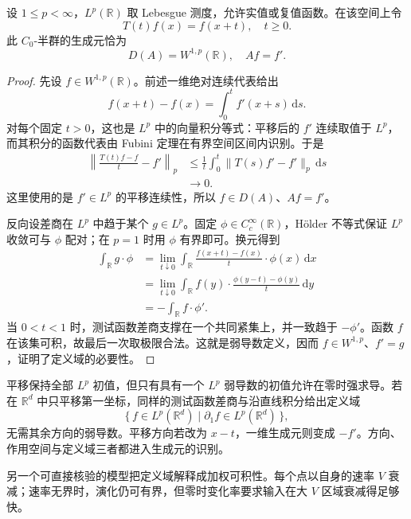 \begin{proposition}[平移生成元]\label{b2:prop:D-translation-generator}
设 \(1\leq p<\infty\)，\(L^p(\mathbb R)\) 取 Lebesgue 测度，允许实值或复值函数。在该空间上令
\[
 T(t)f(x)=f(x+t),\quad t\geq0.
\]
此 \(C_0\)-半群的生成元恰为
\[
 D(A)=W^{1,p}(\mathbb R),\quad Af=f'.
\]
\end{proposition}
\begin{proof}
先设 \(f\in W^{1,p}(\mathbb R)\)。前述一维绝对连续代表给出
\[
 f(x+t)-f(x)=\int_0^tf'(x+s)\,\mathrm ds.
\]
对每个固定 \(t>0\)，这也是 \(L^p\) 中的向量积分等式：平移后的 \(f'\) 连续取值于 \(L^p\)，而其积分的函数代表由 Fubini 定理在有界空间区间内识别。于是
\[
 \begin{aligned}
 \left\|\frac{T(t)f-f}{t}-f'\right\|_p
 &\leq\frac1t\int_0^t\|T(s)f'-f'\|_p\,\mathrm ds\\
 &\longrightarrow0.
 \end{aligned}
\]
这里使用的是 \(f'\in L^p\) 的平移连续性，所以 \(f\in D(A)\)、\(Af=f'\)。

反向设差商在 \(L^p\) 中趋于某个 \(g\in L^p\)。固定 \(\phi\in C_c^\infty(\mathbb R)\)，Hölder 不等式保证 \(L^p\) 收敛可与 \(\phi\) 配对；在 \(p=1\) 时用 \(\phi\) 有界即可。换元得到
\[
 \begin{aligned}
 \int_{\mathbb R}g\cdot\phi
 &=\lim_{t\downarrow0}\int_{\mathbb R}
       \frac{f(x+t)-f(x)}t\cdot\phi(x)\,\mathrm dx\\
 &=\lim_{t\downarrow0}\int_{\mathbb R}
       f(y)\cdot\frac{\phi(y-t)-\phi(y)}t\,\mathrm dy\\
 &=-\int_{\mathbb R}f\cdot\phi'.
 \end{aligned}
\]
当 \(0<t<1\) 时，测试函数差商支撑在一个共同紧集上，并一致趋于 \(-\phi'\)。函数 \(f\) 在该集可积，故最后一次取极限合法。这就是弱导数定义，因而 \(f\in W^{1,p}\)、\(f'=g\)，证明了定义域的必要性。
\end{proof}
平移保持全部 \(L^p\) 初值，但只有具有一个 \(L^p\) 弱导数的初值允许在零时强求导。若在 \(\mathbb R^d\) 中只平移第一坐标，同样的测试函数差商与沿直线积分给出定义域
\[
 \{\,f\in L^p(\mathbb R^d)\mid\partial_1f\in L^p(\mathbb R^d)\,\},
\]
无需其余方向的弱导数。平移方向若改为 \(x-t\)，一维生成元则变成 \(-f'\)。方向、作用空间与定义域三者都进入生成元的识别。

\ProseParagraphBreak

另一个可直接核验的模型把定义域解释成加权可积性。每个点以自身的速率 \(V\) 衰减；速率无界时，演化仍可有界，但零时变化率要求输入在大 \(V\) 区域衰减得足够快。

